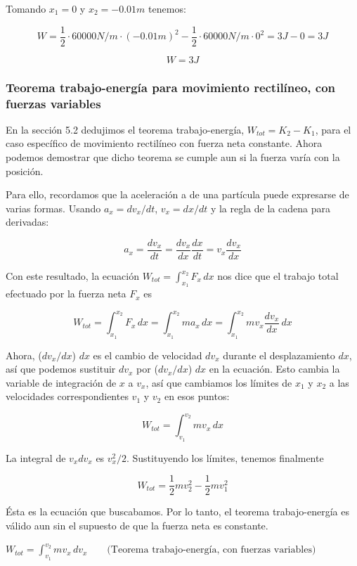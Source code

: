 \documentclass{article}
\newcommand{\newtitle}[1]{
    \color{titleColor}
    \subsubsection{#1}
    \color{black}
}
\newcommand{\definicion}[1]{%
    \vspace{0.5cm}
    \begin{definicionbox}
        #1
    \end{definicionbox}
    \vspace{0.5cm}
}
\begin{document}
    \par Tomando $x_1 = 0$ y $x_2 = -0.01 m$ tenemos:

    \[ W = \frac{1}{2} \cdot 60000 N/m \cdot (-0.01 m)^2 - \frac{1}{2} \cdot 60000 N/m \cdot 0^2 = 3 J - 0 = 3 J \]

    \[ W = 3 J \]

    \newtitle{Teorema trabajo-energía para movimiento rectilíneo, con fuerzas variables}

    \par En la sección 5.2 dedujimos el teorema trabajo-energía, $W_{tot} = K_2 - K_1$, para el caso específico de movimiento rectilíneo con fuerza neta constante. Ahora podemos demostrar que dicho teorema se cumple aun si la fuerza varía con la posición.
    \par Para ello, recordamos que la aceleración a de una partícula puede expresarse de varias formas. Usando $a_x = {dv_x}/{dt}$, $v_x = dx/dt$ y la regla de la cadena para derivadas:

    \[ a_x = \frac{dv_x}{dt} =  \frac{dv_x}{dx} \frac{dx}{dt} = v_x \frac{dv_x}{dx}  \]

    \par Con este resultado, la ecuación $W_{tot} = \int_{x_1}^{x_2} F_x \, dx$ nos dice que el trabajo total efectuado por la fuerza neta $F_x$ es

    \[ W_{tot} = \int_{x_1}^{x_2} F_x \, dx = \int_{x_1}^{x_2} m a_x \, dx = \int_{x_1}^{x_2} m v_x \frac{dv_x}{dx} \, dx \]

    \par Ahora, ($dv_x/dx$) $dx$ es el cambio de velocidad $dv_x$ durante el desplazamiento $dx$, así
que podemos sustituir $dv_x$ por ($dv_x/dx$) $dx$ en la ecuación. Esto cambia la variable de integración de $x$ a $v_x$, así que cambiamos los límites de $x_1$ y $x_2$ a las velocidades correspondientes $v_1$ y $v_2$ en esos puntos:

    \[ W_{tot} = \int_{v_1}^{v_2} m v_x \, dx \]

    \par La integral de $v_xdv_x$ es $v_x^2/2$. Sustituyendo los límites, tenemos finalmente

    \[ W_{tot} = \frac{1}{2} m v_2^2 - \frac{1}{2} m v_1^2 \]

    \par Ésta es la ecuación que buscabamos. Por lo tanto, el teorema trabajo-energía es válido aun sin el supuesto de que la fuerza neta es constante.

    \definicion{
        \centering
        \( W_{tot} = \int_{v_1}^{v_2} m v_x \, dv_x \quad \quad \text{(Teorema trabajo-energía, con fuerzas variables)} \)
    }
\end{document}
